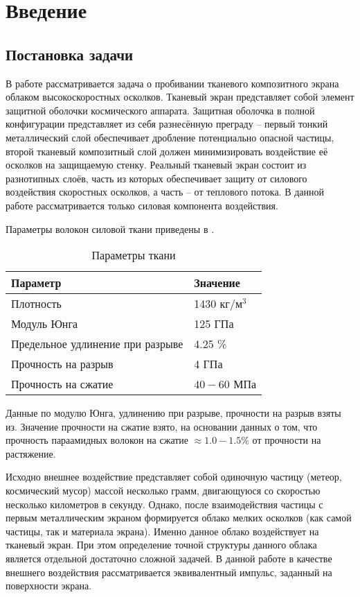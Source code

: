 \chapter{Введение}\label{ch:intro}

\section{Постановка задачи}\label{sec:intro-problem}

В работе рассматривается задача о пробивании тканевого композитного экрана облаком высокоскоростных осколков. 
Тканевый экран представляет собой элемент защитной оболочки космического аппарата. Защитная оболочка в полной 
конфигурации представляет из себя разнесённую преграду -- первый тонкий металлический слой обеспечивает дробление 
потенциально опасной частицы, второй тканевый композитный слой должен минимизировать воздействие её осколков на 
защищаемую стенку. Реальный тканевый экран состоит из разнотипных слоёв, часть из которых обеспечивает 
защиту от силового воздействия скоростных осколков, а часть -- от теплового потока. В данной работе 
рассматривается только силовая компонента воздействия.

Параметры волокон силовой ткани приведены в .

\begin{table}[h]
    \centering
    \caption{Параметры ткани}\label{tbl:kevlar-params}
    \begin{tabular}{|l|l|}
        \hline
        Параметр & Значение      \\ \hline
        Плотность & 1430 $кг/м^3$ \\ \hline
        Модуль Юнга & 125 ГПа       \\ \hline
        Предельное удлинение при разрыве & 4.25 \%       \\ \hline
        Прочность на разрыв & 4 ГПа         \\ \hline
        Прочность на сжатие & $40-60$ МПа     \\ \hline
    \end{tabular}
\end{table}

Данные по модулю Юнга, удлинению при разрыве, прочности на разрыв взяты из\cite{perepelkin2009,mikhailin2013}.
Значение прочности на сжатие взято, на основании данных\cite{papkov1986} о том, что прочность параамидных волокон
на сжатие $\approx 1.0 - 1.5 \%$ от прочности на растяжение.

Исходно внешнее воздействие представляет собой одиночную частицу (метеор, космический мусор) массой несколько грамм, 
двигающуюся со скоростью несколько километров в секунду. Однако, после взаимодействия частицы с первым металлическим 
экраном формируется облако мелких осколков (как самой частицы, так и материала экрана). Именно данное облако воздействует 
на тканевый экран. При этом определение точной структуры данного облака является отдельной достаточно сложной задачей. 
В данной работе в качестве внешнего воздействия рассматривается эквивалентный импульс, заданный на поверхности экрана.

